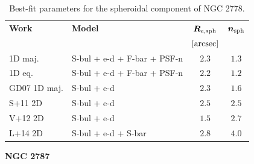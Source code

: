 \documentclass[preprint2]{emulateapj}
\begin{document}
  \begin{table}[h]
  \small
  \caption{Best-fit parameters for the spheroidal component of NGC 2778.}
  \begin{center}
  \begin{tabular}{llcc}
  \hline
  {\bf Work} & {\bf Model}   & $\bm R_{\rm e,sph}$    & $\bm n_{\rm sph}$ \\
    &  &  $[\rm arcsec]$ & \\
  \hline
  1D maj. & S-bul + e-d + F-bar + PSF-n & $2.3$  &  $1.3$ \\
  1D eq.  & S-bul + e-d + F-bar + PSF-n & $2.2$  &  $1.2$ \\
  \hline
  GD07 1D maj.         & S-bul + e-d	     & $2.3$  &  $1.6$ \\
  S+11 2D         & S-bul + e-d	     & $2.5$  &  $2.5$ \\
  V+12 2D         & S-bul + e-d	     & $1.5$  &  $2.7$ \\
  L+14 2D         & S-bul + e-d + S-bar & $2.8$  &  $4.0$ \\
  \hline
  \end{tabular}
  \end{center}
  \label{tab:n2778}
  \end{table}

  \clearpage\newpage\noindent
  {\bf NGC 2787 \\}
\end{document}
